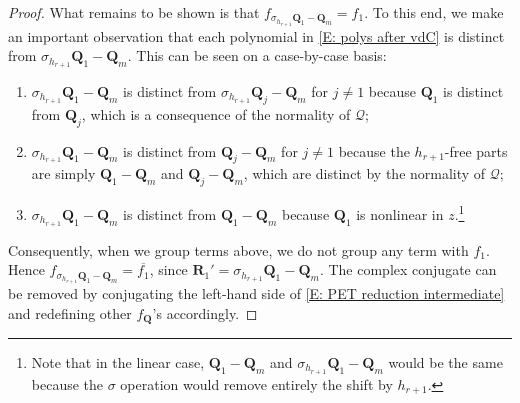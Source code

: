 \documentclass[11pt]{amsart}
\theoremstyle{definition}
\newcommand{\CQ}{{\mathcal Q}}
\newcommand{\bq}{{\mathbf{Q}}}
\newcommand{\q}{{\mathbf{Q}}}
\newcommand{\bx}{{\mathbf{x}}}
\newcommand{\uh}{{\underline{h}}}
\begin{document}
\begin{proof}
        What remains to be shown is that $f_{\sigma_{h_{r+1}}\q_1 - \q_m} = {f_1}$. To this end, we make an important observation that each polynomial in \eqref{E: polys after vdC} is distinct from $\sigma_{h_{r+1}}{\q}_1-{\q}_m$. This can be seen on a case-by-case basis:
        \begin{enumerate}
            \item $\sigma_{h_{r+1}}{\q}_1-{\q}_m$ is distinct from $\sigma_{h_{r+1}}{\q}_j-{\q}_m$ for $j\neq 1$ because $\q_1$ is distinct from $\q_j$, which is a consequence of the normality of $\CQ$;
            \item $\sigma_{h_{r+1}}{\q}_1-{\q}_m$ is distinct from ${\q}_j-{\q}_m$ for $j\neq 1$ because the $h_{r+1}$-free parts are simply $\bq_1-\bq_m$ and $\bq_j-\bq_m$, which are distinct by the normality of $\CQ$;
            \item $\sigma_{h_{r+1}}{\q}_1-{\q}_m$ is distinct from ${\q}_1-{\q}_m$ because $\q_1$ is nonlinear in $z$.\footnote{Note that in the linear case, ${\q}_1-{\q}_m$ and $\sigma_{h_{r+1}}{\q}_1-{\q}_m$ would be the same because the $\sigma$ operation would remove entirely the shift by $h_{r+1}$.}
        \end{enumerate}
        Consequently, when we group terms above, we do not group any term with $f_1$. Hence $f_{\sigma_{h_{r+1}}\q_1 - \q_m} = \overline{f_1}$, since $\mathbf{R}_1' = \sigma_{h_{r+1}}\q_1 - \q_m$.    
        The complex conjugate can be removed by conjugating the left-hand side of \eqref{E: PET reduction intermediate} and redefining other $f_\bq$'s accordingly.     
    \end{proof}
\end{document}
